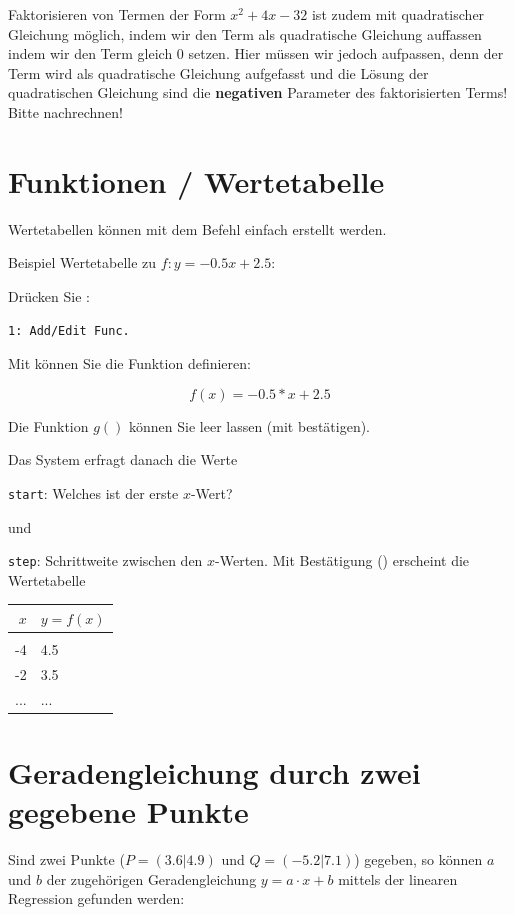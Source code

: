 Faktorisieren von Termen der Form $x^2 +4x -32$ ist zudem mit
quadratischer Gleichung möglich, indem wir den Term als quadratische
Gleichung auffassen indem wir den Term gleich 0 setzen. Hier müssen wir jedoch aufpassen, denn der Term wird als quadratische Gleichung aufgefasst und die Lösung der quadratischen Gleichung sind die \textbf{negativen} Parameter des faktorisierten Terms! Bitte nachrechnen!
\newpage

\section{Funktionen / Wertetabelle}\label{wertetabelle}
Wertetabellen können mit dem Befehl  einfach erstellt
werden.

Beispiel Wertetabelle zu $f: y=-0.5x + 2.5$:

Drücken Sie :

\texttt{1: Add/Edit Func.}

Mit  können Sie die Funktion definieren:

$$f(x) = -0.5 * x + 2.5$$

Die Funktion $g()$ können Sie leer lassen (mit 
bestätigen).

Das System erfragt danach die Werte

\texttt{start}: Welches ist der erste $x$-Wert?

und

\texttt{step}: Schrittweite zwischen den $x$-Werten. Mit Bestätigung
() erscheint die Wertetabelle

\begin{tabular}{r|l}
$x$ & $y=f(x)$\\
\hline\\
-4 & 4.5\\
-2 & 3.5\\
... &  ... \\
\end{tabular}
\newpage
\section{Geradengleichung durch zwei gegebene Punkte}\label{geradengleichung}
Sind zwei Punkte (\zB $P=(3.6 | 4.9)$ und $Q=(-5.2 | 7.1)$) gegeben,
so können $a$ und $b$ der zugehörigen Geradengleichung $y=a\cdot{}x+b$ mittels der
linearen Regression gefunden werden:

